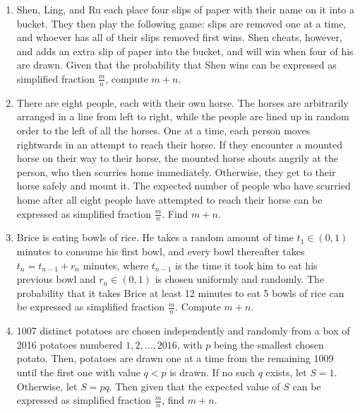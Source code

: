 \documentclass[10pt]{article}
\begin{document}
\begin{enumerate}
\item Shen, Ling, and Ru each place four slips of paper with their name on it into a bucket. They then play the following game: slips are removed one at a time, and whoever has all of their slips removed first wins. Shen cheats, however, and adds an extra slip of paper into the bucket, and will win when four of his are drawn. Given that the probability that Shen wins can be expressed as simplified fraction $\tfrac{m}{n}$, compute $m+n$. %

\item There are eight people, each with their own horse. The horses are arbitrarily arranged in a line from left to right, while the people are lined up in random order to the left of all the horses. One at a time, each person moves rightwards in an attempt to reach their horse. If they encounter a mounted horse on their way to their horse, the mounted horse shouts angrily at the person, who then scurries home immediately. Otherwise, they get to their horse safely and mount it. The expected number of people who have scurried home after all eight people have attempted to reach their horse can be expressed as simplified fraction $\tfrac{m}{n}$. Find $m+n$. %

\item Brice is eating bowls of rice. He takes a random amount of time $t_1 \in (0,1)$ minutes to consume his first bowl, and every bowl thereafter takes $t_n = t_{n-1} + r_n$ minutes, where $t_{n-1}$ is the time it took him to eat his previous bowl and $r_n \in (0,1)$ is chosen uniformly and randomly. The probability that it takes Brice at least 12 minutes to eat 5 bowls of rice can be expressed as simplified fraction $\tfrac{m}{n}$. Compute $m+n$. %

\item 1007 distinct potatoes are chosen independently and randomly from a box of 2016 potatoes numbered $1, 2, \dots, 2016$, with $p$ being the smallest chosen potato. Then, potatoes are drawn one at a time from the remaining 1009 until the first one with value $q < p$ is drawn. If no such $q$ exists, let $S = 1$. Otherwise, let $S = pq$. Then given that the expected value of $S$ can be expressed as simplified fraction $\tfrac{m}{n}$, find $m+n$. %




\end{enumerate}
\end{document}
